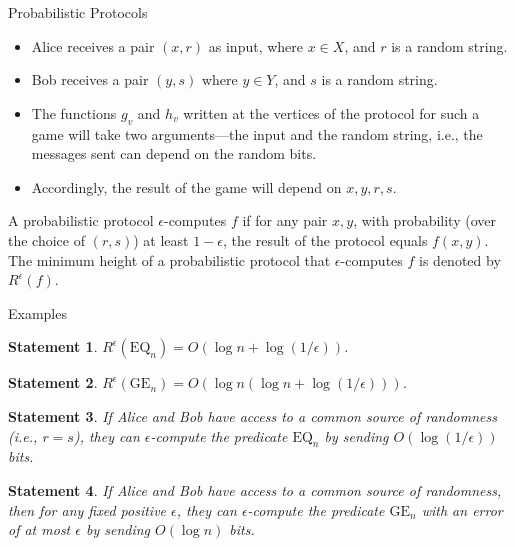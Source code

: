 \documentclass[aspectratio=169]{beamer}
\newcommand{\pitem}{\pause\item}
\newtheorem{statement}{Statement}
\begin{document}
\begin{frame}{Probabilistic Protocols}
    \begin{itemize}
    \item Alice receives a pair $(x,r)$ as input, where $x \in X$, and $r$ is a random string.
    \pitem Bob receives a pair $(y,s)$ where $y \in Y$, and $s$ is a random string.
    \pitem The functions $g_v$ and $h_v$ written at the vertices of the protocol for such a game will take two arguments—the input and the random string, i.e., the messages sent can depend on the random bits.

    \pitem Accordingly, the result of the game will depend on $x,y,r,s$.
    \end{itemize}

    \pause
    \begin{definition}
        A probabilistic protocol $\epsilon$-computes $f$ if for any pair $x,y$, with probability (over the choice of $(r,s)$) at least $1 - \epsilon$, the result of the protocol equals $f(x,y)$. The minimum height of a probabilistic protocol that $\epsilon$-computes $f$ is denoted by $R^\epsilon(f)$.
    \end{definition}

\end{frame}

\begin{frame}{Examples}
    \begin{statement}
        $R^\epsilon(\mathrm{EQ}_n) = O(\log n + \log(1/\epsilon))$.
    \end{statement}

    \pause
    \begin{statement}
        $R^\epsilon(\mathrm{GE}_n) = O(\log n(\log n + \log(1/\epsilon)))$.
    \end{statement}

    \pause
    \begin{statement}
        If Alice and Bob have access to a common source of randomness (i.e., $r = s$), they can $\epsilon$-compute the predicate $\mathrm{EQ}_n$ by sending $O(\log(1/\epsilon))$ bits.
    \end{statement}

    \pause
    \begin{statement}
        If Alice and Bob have access to a common source of randomness, then for any fixed positive $\epsilon$, they can $\epsilon$-compute the predicate $\mathrm{GE}_n$ with an error of at most $\epsilon$ by sending $O(\log n)$ bits.
    \end{statement}
\end{frame}
\end{document}

